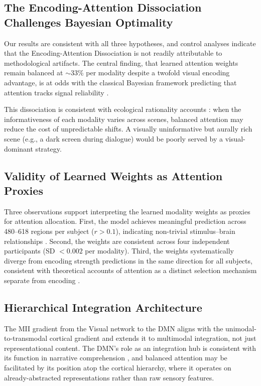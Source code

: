 \documentclass[conference]{IEEEtran}
\begin{document}
\subsection{The Encoding-Attention Dissociation Challenges Bayesian Optimality}

Our results are consistent with all three hypotheses, and control analyses indicate that the Encoding-Attention Dissociation is not readily attributable to methodological artifacts. The central finding, that learned attention weights remain balanced at $\sim$33\% per modality despite a twofold visual encoding advantage, is at odds with the classical Bayesian framework predicting that attention tracks signal reliability \cite{ernst2002humans, knill2004bayesian}.

This dissociation is consistent with ecological rationality accounts \cite{gigerenzer2009homo}: when the informativeness of each modality varies across scenes, balanced attention may reduce the cost of unpredictable shifts. A visually uninformative but aurally rich scene (e.g., a dark screen during dialogue) would be poorly served by a visual-dominant strategy.

\subsection{Validity of Learned Weights as Attention Proxies}

Three observations support interpreting the learned modality weights as proxies for attention allocation. First, the model achieves meaningful prediction across 480--618 regions per subject ($r > 0.1$), indicating non-trivial stimulus--brain relationships \cite{kriegeskorte2008representational, yamins2016using}. Second, the weights are consistent across four independent participants (SD $< 0.002$ per modality). Third, the weights systematically diverge from encoding strength predictions in the same direction for all subjects, consistent with theoretical accounts of attention as a distinct selection mechanism separate from encoding \cite{lindsay2020attention}.

\subsection{Hierarchical Integration Architecture}

The MII gradient from the Visual network to the DMN aligns with the unimodal-to-transmodal cortical gradient \cite{margulies2016situating} and extends it to multimodal integration, not just representational content. The DMN's role as an integration hub is consistent with its function in narrative comprehension \cite{simony2016dynamic}, and balanced attention may be facilitated by its position atop the cortical hierarchy, where it operates on already-abstracted representations rather than raw sensory features.
\end{document}
